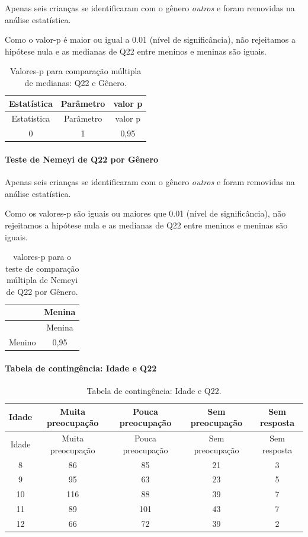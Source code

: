 \documentclass[]{article}
\let\oldparagraph\paragraph
\renewcommand{\paragraph}[1]{\oldparagraph{#1}\mbox{}}
\begin{document}
Apenas seis crianças se identificaram com o gênero \emph{outros} e foram removidas na análise estatística.

Como o valor-p é maior ou igual a 0.01 (nível de significância), não rejeitamos a hipótese nula e as medianas de Q22 entre meninos e meninas são iguais.

\begin{longtable}[]{@{}ccc@{}}
\caption{\label{tab:unnamed-chunk-502}Valores-p para comparação múltipla de medianas: Q22 e Gênero.}\tabularnewline
\toprule
Estatística & Parâmetro & valor p\tabularnewline
\midrule
\endfirsthead
\toprule
Estatística & Parâmetro & valor p\tabularnewline
\midrule
\endhead
0 & 1 & 0,95\tabularnewline
\bottomrule
\end{longtable}

\hypertarget{teste-de-nemeyi-de-q22-por-guxeanero}{%
\paragraph{Teste de Nemeyi de Q22 por Gênero}\label{teste-de-nemeyi-de-q22-por-guxeanero}}

Apenas seis crianças se identificaram com o gênero \emph{outros} e foram removidas na análise estatística.

Como os valores-p são iguais ou maiores que 0.01 (nível de significância), não rejeitamos a hipótese nula e as medianas de Q22 entre meninos e meninas são iguais.

\begin{longtable}[]{@{}lc@{}}
\caption{\label{tab:unnamed-chunk-504}valores-p para o teste de comparação múltipla de Nemeyi de Q22 por Gênero.}\tabularnewline
\toprule
& Menina\tabularnewline
\midrule
\endfirsthead
\toprule
& Menina\tabularnewline
\midrule
\endhead
Menino & 0,95\tabularnewline
\bottomrule
\end{longtable}

\cleardoublepage

\hypertarget{tabela-de-continguxeancia-idade-e-q22}{%
\paragraph{Tabela de contingência: Idade e Q22}\label{tabela-de-continguxeancia-idade-e-q22}}

\begin{longtable}[]{@{}ccccc@{}}
\caption{\label{tab:unnamed-chunk-505}Tabela de contingência: Idade e Q22.}\tabularnewline
\toprule
Idade & Muita preocupação & Pouca preocupação & Sem preocupação & Sem resposta\tabularnewline
\midrule
\endfirsthead
\toprule
Idade & Muita preocupação & Pouca preocupação & Sem preocupação & Sem resposta\tabularnewline
\midrule
\endhead
8 & 86 & 85 & 21 & 3\tabularnewline
9 & 95 & 63 & 23 & 5\tabularnewline
10 & 116 & 88 & 39 & 7\tabularnewline
11 & 89 & 101 & 43 & 7\tabularnewline
12 & 66 & 72 & 39 & 2\tabularnewline
\bottomrule
\end{longtable}
\end{document}
